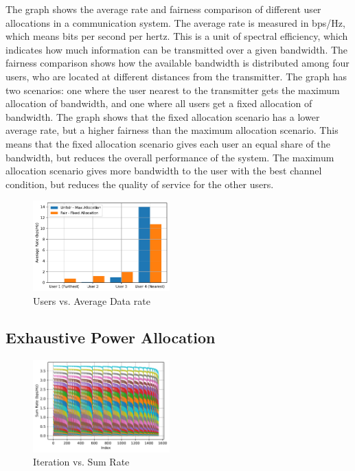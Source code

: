 \documentclass[conference]{IEEEtran}
\begin{document}
The graph shows the average rate and fairness comparison of different user allocations in a communication system. The average rate is measured in bps/Hz, which means bits per second per hertz. This is a unit of spectral efficiency, which indicates how much information can be transmitted over a given bandwidth. The fairness comparison shows how the available bandwidth is distributed among four users, who are located at different distances from the transmitter. The graph has two scenarios: one where the user nearest to the transmitter gets the maximum allocation of bandwidth, and one where all users get a fixed allocation of bandwidth. The graph shows that the fixed allocation scenario has a lower average rate, but a higher fairness than the maximum allocation scenario. This means that the fixed allocation scenario gives each user an equal share of the bandwidth, but reduces the overall performance of the system. The maximum allocation scenario gives more bandwidth to the user with the best channel condition, but reduces the quality of service for the other users. 

\begin{figure}[t!]
    \centering
    \includegraphics[width=0.47\textwidth , height= 0.35\textwidth]{figures/fairness_comparison.pdf}
    \caption{Users vs. Average Data rate}
\end{figure}

\subsection{Exhaustive Power Allocation}

\begin{figure}[b!]
    \centering
    \includegraphics[width=0.47\textwidth]{figures/sumrate_vs_index.pdf}
    \caption{Iteration vs. Sum Rate}
\end{figure}
\end{document}
